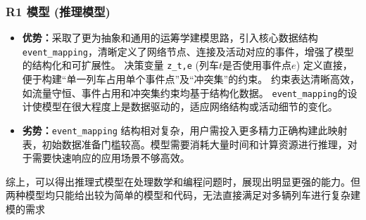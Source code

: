 \documentclass{article}
\begin{document}
\subsubsection{R1 模型 (推理模型)}
\begin{itemize}
    \item \textbf{优势：}采取了更为抽象和通用的运筹学建模思路，引入核心数据结构
        \texttt{event\_mapping}，清晰定义了网络节点、连接及活动对应的事件，增强了模型的结构化和可扩展性。
        决策变量 \texttt{z\_t,e} (列车\(t\)是否使用事件点\(e\))
        定义直接，便于构建“单一列车占用单个事件点”及“冲突集”的约束。
        约束表达清晰高效，如流量守恒、事件占用和冲突集约束均基于结构化数据。
        \texttt{event\_mapping}的设计使模型在很大程度上是数据驱动的，适应网络结构或活动细节的变化。
    \item \textbf{劣势：}\texttt{event\_mapping}
        结构相对复杂，用户需投入更多精力正确构建此映射表，初始数据准备门槛较高。模型需要消耗大量时间和计算资源进行推理，对于需要快速响应的应用场景不够高效。
\end{itemize}

综上，可以得出推理式模型在处理数学和编程问题时，展现出明显更强的能力。但两种模型均只能给出较为简单的模型和代码，无法直接满足对多辆列车进行复杂建模的需求
\end{document}
